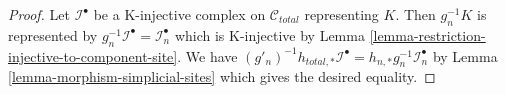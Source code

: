 \documentclass{stacks-project}
\theoremstyle{plain}
\theoremstyle{definition}
\theoremstyle{remark}
\numberwithin{equation}{subsection}
\begin{document}
\begin{proof}
Let $\mathcal{I}^\bullet$ be a K-injective complex on $\mathcal{C}_{total}$
representing $K$. Then $g_n^{-1}K$ is represented by
$g_n^{-1}\mathcal{I}^\bullet = \mathcal{I}_n^\bullet$
which is K-injective by
Lemma \ref{lemma-restriction-injective-to-component-site}.
We have $(g'_n)^{-1}h_{total, *}\mathcal{I}^\bullet =
h_{n, *}g_n^{-1}\mathcal{I}_n^\bullet$ by
Lemma \ref{lemma-morphism-simplicial-sites}
which gives the desired equality.
\end{proof}
\end{document}
